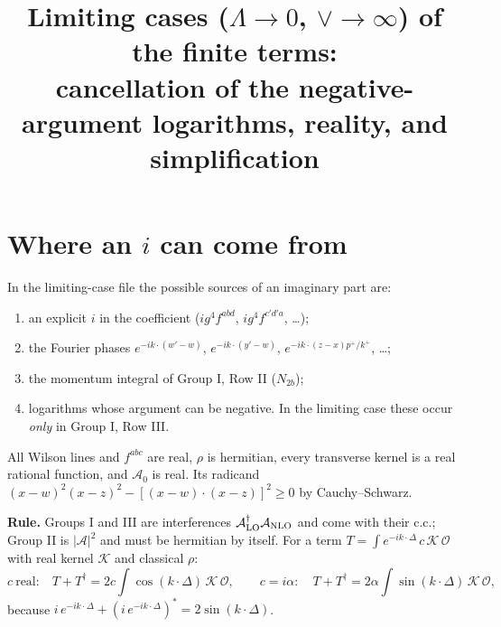 \documentclass[10pt]{article}
\title{Limiting cases ($\Lambda\to0$, $\vee\to\infty$) of the finite terms:\\ cancellation of the negative-argument logarithms, reality, and simplification}
\date{}
\numberwithin{equation}{section}
\begin{document}
\maketitle

\section{Where an $i$ can come from}
In the limiting-case file the possible sources of an imaginary part are:
\begin{enumerate}
\item[(C1)] an explicit $i$ in the coefficient ($ig^{4}f^{abd}$, $ig^{4}f^{c'd'a}$, \dots);
\item[(C2)] the Fourier phases $e^{-ik\cdot(w'-w)}$, $e^{-ik\cdot(y'-w)}$, $e^{-ik\cdot(z-x)p^{+}/k^{+}}$, \dots;
\item[(C3)] the momentum integral of Group I, Row II ($N_{2b}$);
\item[(C4)] logarithms whose argument can be negative. In the limiting case these occur \emph{only} in Group I, Row III.
\end{enumerate}
All Wilson lines and $f^{abc}$ are real, $\rho$ is hermitian, every transverse kernel is a real rational function, and $\mathcal A_{0}$ is real. Its radicand $(x-w)^{2}(x-z)^{2}-[(x-w)\cdot(x-z)]^{2}\ge0$ by Cauchy--Schwarz.

\textbf{Rule.} Groups I and III are interferences $\mathcal A_{\rm LO}^{\dagger}\mathcal A_{\rm NLO}$ and come with their c.c.; Group II is $|\mathcal A|^{2}$ and must be hermitian by itself. For a term $T=\int e^{-ik\cdot\Delta}\,c\,\mathcal K\,\mathcal O$ with real kernel $\mathcal K$ and classical $\rho$:
\begin{equation}
c\ \text{real:}\quad T+T^{\dagger}=2c\int\cos(k\cdot\Delta)\,\mathcal K\,\mathcal O,\qquad
c=i\alpha:\quad T+T^{\dagger}=2\alpha\int\sin(k\cdot\Delta)\,\mathcal K\,\mathcal O,
\label{eq:rule}
\end{equation}
because $i\,e^{-ik\cdot\Delta}+(i\,e^{-ik\cdot\Delta})^{*}=2\sin(k\cdot\Delta)$.
\end{document}
